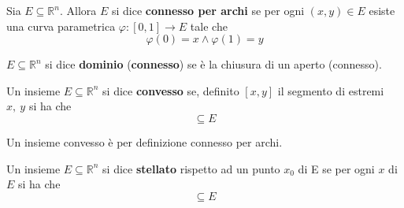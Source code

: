\begin{definition}
    Sia $E \subseteq \mathbb{R}^n$. Allora $E$ si dice \textbf{connesso per archi} se per ogni $(x,y) \in E$ esiste una curva parametrica $\varphi:[0,1] \to E$ tale che
    \begin{equation}
        \varphi(0)=x \land \varphi(1)=y
    \end{equation}
\end{definition}
\begin{definition}
   $E \subseteq \mathbb{R}^n$ si dice \textbf{dominio} (\textbf{connesso}) se è la chiusura di un aperto (connesso).
\end{definition}
\begin{definition}
    Un insieme $E \subseteq \mathbb{R}^n$ si dice \textbf{convesso} se, definito $[x,y]$ il segmento di estremi $x,\ y$ si ha che
    \begin{equation}
        [x,y] \subseteq E
    \end{equation}
    \end{definition}
    \begin{oss}
        Un insieme convesso è per definizione connesso per archi.
    \end{oss}
\begin{definition}
    Un insieme $E \subseteq \mathbb{R}^n$ si dice \textbf{stellato} rispetto ad un punto $x_0$ di E se per ogni $x$ di $E$ si ha che
    \begin{equation}
        [x_0, x] \subseteq E
    \end{equation}
\end{definition}



